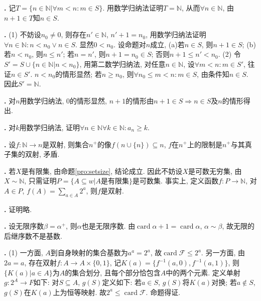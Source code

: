 \par \textbf{\thesolset .} 记$T=\{n\in \mathbb{N} \vert \forall m < n: m\in S\}$. 用数学归纳法证明$T=\mathbb{N}$, 从而$\forall n\in \mathbb{N}$, 由$n+1\in T$知$n\in S$. 

\par \textbf{\thesolset .} (1) 不妨设$n_0\neq 0$, 则存在$n'\in \mathbb{N}$, $n'+1=n_0$, 用数学归纳法证明$\forall n\in \mathbb{N}: n<n_0 \lor n\in S$. 显然$0<n_0$. 设命题对$n$成立, (a)若$n\in S$, 则$n+1\in S$; (b)若$n<n_0$, 则$n\le n'$; 若$n=n'$, 则$n+1=n_0\in S$; 否则$n+1\le n'<n_0$. (2) 令$S'=S\cup \{n\in\mathbb{N}\vert n<n_0\}$, 用第二数学归纳法, 对任意$n\in \mathbb{N}$, 设$\forall m<n: m\in S'$, 往证$n\in S'$. $n<n_0$的情形显然; 若$n\ge n_0$, 则$\forall n_0\le m<n: m\in S$, 由条件知$n\in S$. 因此$S'=\mathbb{N}$. 

\par \textbf{\thesolset .} 对$n$用数学归纳法, 0的情形显然, $n+1$的情形由$n+1\in S\Rightarrow n\in S$及$n$的情形得出. 

\par \textbf{\thesolset .} 对$k$用数学归纳法, 证明$\forall n\in \mathbb{N}\forall k\in \mathbb{N}: a_n\ge k$. 

\par \textbf{\thesolset .}
设$f:\mathbb{N} \to  n$是双射, 则集合$n^+$的像$f(n\cup \{n\})\subseteq n$, $f$在$n^+$上的限制是$n^+$与其真子集的双射, 矛盾. 

\par \textbf{\thesolset .} 若$X$是有限集, 由命题\ref{pro:setsize}, 结论成立. 因此不妨设$X$是可数无穷集, 由$X\sim \mathbb{N}$, 只需证明$P=\{A\subseteq w\vert A\text{是有限集}\}$是可数集. 事实上, 定义函数$f:P\to \mathbb{N}$, 对$A\in P$, $f(A)=\sum_{a\in A} 2^a$, 则$f$是双射. 

\par \textbf{\thesolset .} 证明略. 

\par \textbf{\thesolset .} 设无限序数$\beta=\alpha^+$, 则$\alpha$也是无限序数. 由$\operatorname{card}\alpha + 1=\operatorname{card}\alpha$, $\alpha\sim\beta$, 故无限的后继序数不是基数. 

\par \textbf{\thesolset .} (1) 一方面, $A$到自身映射的集合基数为$a^a=2^a$, 故$\operatorname{card} \mathcal{F} \le 2^a$. 另一方面, 由$2a=a$, 存在双射$f: A\to A\times\{0,1\}$, 记$K(a)=\{f^{-1}(a,0), f^{-1}(a,1)\}$, 则$\{K(a)\vert a\in A\}$为$A$的集合划分, 且每个部分恰包含$A$中的两个元素. 定义单射$g: 2^A\to F$如下: 对$S\subseteq A$, $g(S)$定义如下: 若$a\in S$, $g(S)$将$K(a)$对换; 若$a\notin S$, $g(S)$在$K(a)$上为恒等映射. 故$2^a\le \operatorname{card} \mathcal{F}$. 命题得证. 

